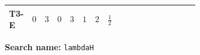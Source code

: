 \documentclass[8pt]{article}
\begin{document}
\begin{landscape}
\begin{longtable}{@{}llcccccc >{\raggedright\arraybackslash}p{0.21\linewidth} >{\raggedright\arraybackslash}p{0.21\linewidth} >{\raggedright\arraybackslash}p{0.21\linewidth}@{}}
\midrule
T3-E & $0$ & $3$ & $0$ & $3$ & $1$ & $2$ & $\frac{1}{2}$ & \scriptsize\adjustbox{max width=\linewidth}{$\begin{gathered} {\lambda_H} (12 \operatorname{Tr}\!\left({Y_d}\,\left({Y_d}\right)^{\dagger}\right)+4 \operatorname{Tr}\!\left({Y_e}\,\left({Y_e}\right)^{\dagger}\right)+12 \operatorname{Tr}\!\left({Y_u}\,\left({Y_u}\right)^{\dagger}\right))\end{gathered}$} & \scriptsize\adjustbox{max width=\linewidth}{$\begin{gathered} -12 \operatorname{Tr}\!\left({Y_d}\,\left({Y_d}\right)^{\dagger}\,{Y_d}\,\left({Y_d}\right)^{\dagger}\right)\end{gathered}$} & \scriptsize\adjustbox{max width=\linewidth}{$\begin{gathered} -4 \operatorname{Tr}\!\left({Y_e}\,\left({Y_e}\right)^{\dagger}\,{Y_e}\,\left({Y_e}\right)^{\dagger}\right)\end{gathered}$} \\
\midrule
\bottomrule
\end{longtable}
\clearpage
\noindent\textbf{Search name: }\texttt{lambdaH}\par\smallskip

\end{landscape}
\end{document}
